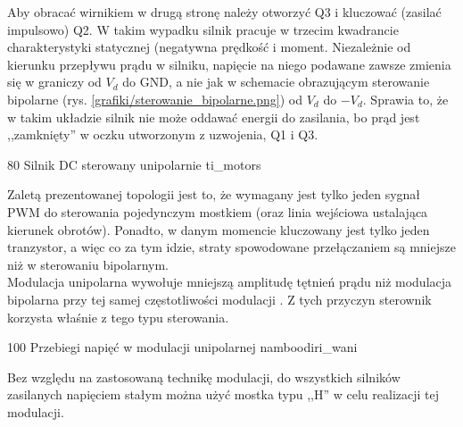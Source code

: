 Aby obracać wirnikiem w drugą stronę należy otworzyć Q3 i kluczować (zasilać impulsowo) Q2. W takim wypadku silnik pracuje w trzecim kwadrancie charakterystyki statycznej (negatywna prędkość i moment. Niezależnie od kierunku przepływu prądu w silniku, napięcie na niego podawane zawsze zmienia się w graniczy od $ V_d $ do GND, a nie jak w schemacie obrazującym sterowanie bipolarne (rys. \ref{grafiki/sterowanie_bipolarne.png}) od $ V_d $ do $ -V_d $. Sprawia to, że w takim układzie silnik nie może oddawać energii do zasilania, bo prąd jest ,,zamknięty'' w oczku utworzonym z uzwojenia, Q1 i Q3. 

	{80}
	{Silnik DC sterowany unipolarnie}
	{ti_motors}


Zaletą prezentowanej topologii jest to, że wymagany jest tylko jeden sygnał PWM do sterowania pojedynczym mostkiem (oraz linia wejściowa ustalająca kierunek obrotów). Ponadto, w danym momencie kluczowany jest tylko jeden tranzystor, a więc co za tym idzie, straty spowodowane przełączaniem są mniejsze niż w sterowaniu bipolarnym. \\

Modulacja unipolarna wywołuje mniejszą amplitudę tętnień prądu niż modulacja bipolarna przy tej samej częstotliwości modulacji \cite{zawirski}. Z tych przyczyn sterownik korzysta właśnie z tego typu sterowania.

	{100}
	{Przebiegi napięć w modulacji unipolarnej}
	{namboodiri_wani}

Bez względu na zastosowaną technikę modulacji, do wszystkich silników zasilanych napięciem stałym można użyć mostka typu ,,H'' w celu realizacji tej modulacji. 





